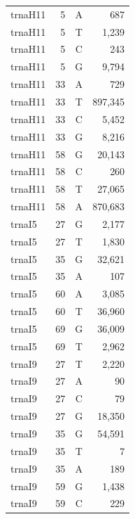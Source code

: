 \documentclass[12pt]{rockefeller}
\begin{document}
\begin{tiny}
\begin{longtable}{|l|r|c|r|}
 trnaH11 &         5 &          A &        687 \\
 trnaH11 &         5 &          T &      1,239 \\
 trnaH11 &         5 &          C &        243 \\
 trnaH11 &         5 &          G &      9,794 \\
 trnaH11 &        33 &          A &        729 \\
 trnaH11 &        33 &          T &    897,345 \\
 trnaH11 &        33 &          C &      5,452 \\
 trnaH11 &        33 &          G &      8,216 \\
 trnaH11 &        58 &          G &     20,143 \\
 trnaH11 &        58 &          C &        260 \\
 trnaH11 &        58 &          T &     27,065 \\
 trnaH11 &        58 &          A &    870,683 \\
  trnaI5 &        27 &          G &      2,177 \\
  trnaI5 &        27 &          T &      1,830 \\
  trnaI5 &        35 &          G &     32,621 \\
  trnaI5 &        35 &          A &        107 \\
  trnaI5 &        60 &          A &      3,085 \\
  trnaI5 &        60 &          T &     36,960 \\
  trnaI5 &        69 &          G &     36,009 \\
  trnaI5 &        69 &          T &      2,962 \\
  trnaI9 &        27 &          T &      2,220 \\
  trnaI9 &        27 &          A &         90 \\
  trnaI9 &        27 &          C &         79 \\
  trnaI9 &        27 &          G &     18,350 \\
  trnaI9 &        35 &          G &     54,591 \\
  trnaI9 &        35 &          T &          7 \\
  trnaI9 &        35 &          A &        189 \\
  trnaI9 &        59 &          G &      1,438 \\
  trnaI9 &        59 &          C &        229 \\

\end{longtable}
\end{tiny}
\end{document}
